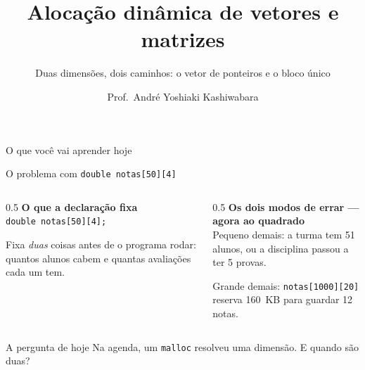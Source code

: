 \documentclass[aspectratio=169]{beamer}
\title{Alocação dinâmica de vetores e matrizes}
\subtitle{Duas dimensões, dois caminhos: o vetor de ponteiros e o bloco único}
\author{Prof.\ André Yoshiaki Kashiwabara}
\institute{DCOMP -- Universidade Federal de Sergipe\\
\texttt{andreyoshiaki@dcomp.ufs.br}}
\date{}
\begin{document}
\begin{frame}[plain]
  \titlepage
\end{frame}

\begin{frame}{O que você vai aprender hoje}
  \begin{center}
  \end{center}
\end{frame}

\begin{frame}{O problema com \texttt{double notas[50][4]}}
  \begin{columns}[T]
    \begin{column}{0.5\textwidth}
      \textbf{O que a declaração fixa}\\[0.3em]
      \texttt{double notas[50][4];}

      \medskip
      Fixa \emph{duas} coisas antes de o programa rodar: quantos alunos cabem e
      quantas avaliações cada um tem.
    \end{column}
    \begin{column}{0.5\textwidth}
      \textbf{Os dois modos de errar --- agora ao quadrado}\\[0.3em]
      \textcolor{UFSRed}{Pequeno demais:} a turma tem 51 alunos, ou a
      disciplina passou a ter 5 provas.

      \medskip
      \textcolor{UFSRed}{Grande demais:} \texttt{notas[1000][20]} reserva
      160~KB para guardar 12 notas.
    \end{column}
  \end{columns}
  \begin{block}{A pergunta de hoje}
    Na agenda, um \texttt{malloc} resolveu uma dimensão. E quando são duas?
  \end{block}
\end{frame}
\end{document}
